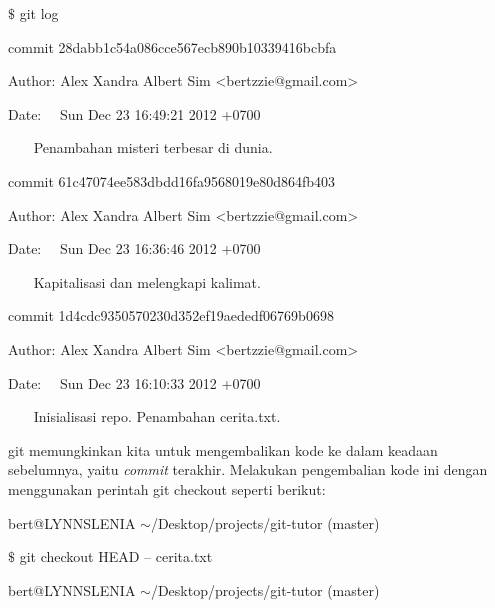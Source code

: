 {\fontsize{10pt}{10pt}\selectfont  $  \$  $ git log} \par
\noindent 
{\fontsize{10pt}{10pt}\selectfont commit 28dabb1c54a086cce567ecb890b10339416bcbfa} \par
\noindent 
{\fontsize{10pt}{10pt}\selectfont Author: Alex Xandra Albert Sim <bertzzie@gmail.com>} \par
\noindent 
{\fontsize{10pt}{10pt}\selectfont Date:~~ Sun Dec 23 16:49:21 2012 +0700} \par
\noindent 
\vspace{10pt}
\noindent 
{\fontsize{10pt}{10pt}\selectfont ~~~ Penambahan misteri terbesar di dunia.} \par
\noindent 
\vspace{10pt}
\noindent 
{\fontsize{10pt}{10pt}\selectfont commit 61c47074ee583dbdd16fa9568019e80d864fb403} \par
\noindent 
{\fontsize{10pt}{10pt}\selectfont Author: Alex Xandra Albert Sim <bertzzie@gmail.com>} \par
\noindent 
{\fontsize{10pt}{10pt}\selectfont Date:~~ Sun Dec 23 16:36:46 2012 +0700} \par
\noindent 
\vspace{10pt}
\noindent 
{\fontsize{10pt}{10pt}\selectfont ~~~ Kapitalisasi dan melengkapi kalimat.} \par
\noindent 
\vspace{10pt}
\noindent 
{\fontsize{10pt}{10pt}\selectfont commit 1d4cdc9350570230d352ef19aededf06769b0698} \par
\noindent 
{\fontsize{10pt}{10pt}\selectfont Author: Alex Xandra Albert Sim <bertzzie@gmail.com>} \par
\noindent 
{\fontsize{10pt}{10pt}\selectfont Date:~~ Sun Dec 23 16:10:33 2012 +0700} \par
\noindent 
\vspace{10pt}
\noindent 
{\fontsize{10pt}{10pt}\selectfont ~~~ Inisialisasi repo. Penambahan cerita.txt.} \par
\vspace{12pt}
git memungkinkan kita untuk mengembalikan kode ke dalam keadaan sebelumnya, yaitu \emph{commit} terakhir. Melakukan pengembalian kode ini dengan menggunakan perintah git checkout seperti berikut: \par
\noindent 
bert@LYNNSLENIA  $  \sim  $/Desktop/projects/git-tutor (master) \par
\noindent 
 $  \$  $ git checkout HEAD -- cerita.txt \par
\noindent 
bert@LYNNSLENIA  $  \sim  $/Desktop/projects/git-tutor (master) \par

